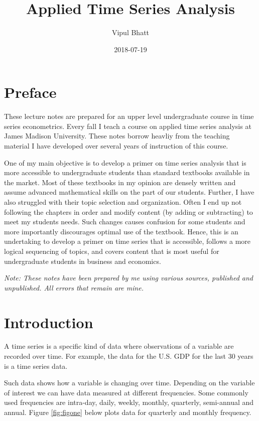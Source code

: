 \documentclass[]{book}
\title{Applied Time Series Analysis}
\author{Vipul Bhatt}
\date{2018-07-19}
\theoremstyle{definition}
\theoremstyle{definition}
\theoremstyle{definition}
\theoremstyle{remark}
\begin{document}
\maketitle

{
\setcounter{tocdepth}{1}
\tableofcontents
}
\chapter*{Preface}\label{preface}

These lecture notes are prepared for an upper level undergraduate course
in time series econometrics. Every fall I teach a course on applied time
series analysis at James Madison University. These notes borrow heavliy
from the teaching material I have developed over several years of
instruction of this course.

One of my main objective is to develop a primer on time series analysis
that is more accessible to undergraduate students than standard
textbooks available in the market. Most of these textbooks in my opinion
are densely written and assume advanced mathematical skills on the part
of our students. Further, I have also struggled with their topic
selection and organization. Often I end up not following the chapters in
order and modify content (by adding or subtracting) to meet my students
needs. Such changes causes confusion for some students and more
importantly discourages optimal use of the textbook. Hence, this is an
undertaking to develop a primer on time series that is accessible,
follows a more logical sequencing of topics, and covers content that is
most useful for undergraduate students in business and economics.

\emph{Note: These notes have been prepared by me using various sources,
published and unpublished. All errors that remain are mine.}

\chapter{Introduction}\label{intro}

A time series is a specific kind of data where observations of a
variable are recorded over time. For example, the data for the U.S. GDP
for the last 30 years is a time series data.

Such data shows how a variable is changing over time. Depending on the
variable of interest we can have data measured at different frequencies.
Some commonly used frequencies are intra-day, daily, weekly, monthly,
quarterly, semi-annual and annual. Figure \ref{fig:figone} below plots
data for quarterly and monthly frequency.
\end{document}
